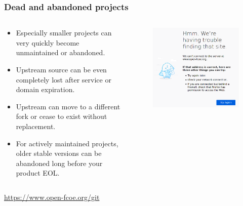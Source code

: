 \documentclass[aspectratio=169]{beamer}              %
\begin{document}
\begin{frame}
	\frametitle{Dead and abandoned projects}
	
	\begin{columns}
\begin{column}{0.55\textwidth}

	\begin{block}{}
		\begin{itemize}
			\item Especially smaller projects can very quickly become unmaintained or abandoned.
			\item Upstream source can be even completely lost after service or domain expiration.
			\item Upstream can move to a different fork or cease to exist without replacement.
			\item For actively maintained projects, older stable versions can be abandoned long before your product EOL.
		\end{itemize}
	\end{block}

\end{column}

\begin{column}{0.45\textwidth}
	\begin{figure}[ht!]
	\begin{center}
  	  \includegraphics[width=1\textwidth]{img/dead-project.png}
	\end{center}
	\end{figure}
\end{column}
\end{columns}

\vspace{3mm}
\tiny{\url{https://www.open-fcoe.org/git}}
\end{frame}
\end{document}
